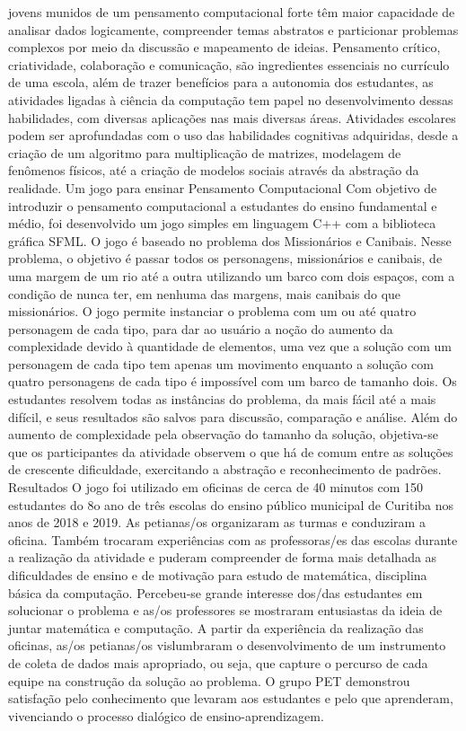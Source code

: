 jovens munidos de um pensamento computacional forte têm maior capacidade de analisar dados
logicamente, compreender temas abstratos e particionar problemas complexos por meio da
discussão e mapeamento de ideias.
Pensamento crítico, criatividade, colaboração e comunicação, são ingredientes essenciais
no currículo de uma escola, além de trazer benefícios para a autonomia dos estudantes, as
atividades ligadas à ciência da computação tem papel no desenvolvimento dessas habilidades,
com diversas aplicações nas mais diversas áreas. Atividades escolares podem ser aprofundadas
com o uso das habilidades cognitivas adquiridas, desde a criação de um algoritmo para
multiplicação de matrizes, modelagem de fenômenos físicos, até a criação de modelos sociais
através da abstração da realidade.
Um jogo para ensinar Pensamento Computacional
Com objetivo de introduzir o pensamento computacional a estudantes do ensino
fundamental e médio, foi desenvolvido um jogo simples em linguagem C++ com a biblioteca
gráfica SFML. O jogo é baseado no problema dos Missionários e Canibais. Nesse problema, o
objetivo é passar todos os personagens, missionários e canibais, de uma margem de um rio até a
outra utilizando um barco com dois espaços, com a condição de nunca ter, em nenhuma das
margens, mais canibais do que missionários. O jogo permite instanciar o problema com um ou
até quatro personagem de cada tipo, para dar ao usuário a noção do aumento da complexidade
devido à quantidade de elementos, uma vez que a solução com um personagem de cada tipo tem
apenas um movimento enquanto a solução com quatro personagens de cada tipo é impossível
com um barco de tamanho dois. Os estudantes resolvem todas as instâncias do problema, da mais
fácil até a mais difícil, e seus resultados são salvos para discussão, comparação e análise. Além
do aumento de complexidade pela observação do tamanho da solução, objetiva-se que os
participantes da atividade observem o que há de comum entre as soluções de crescente
dificuldade, exercitando a abstração e reconhecimento de padrões.
Resultados
O jogo foi utilizado em oficinas de cerca de 40 minutos com 150 estudantes do 8o ano de
três escolas do ensino público municipal de Curitiba nos anos de 2018 e 2019. As petianas/os
organizaram as turmas e conduziram a oficina. Também trocaram experiências com as
professoras/es das escolas durante a realização da atividade e puderam compreender de forma
mais detalhada as dificuldades de ensino e de motivação para estudo de matemática, disciplina
básica da computação. Percebeu-se grande interesse dos/das estudantes em solucionar o
problema e as/os professores se mostraram entusiastas da ideia de juntar matemática e
computação. A partir da experiência da realização das oficinas, as/os petianas/os vislumbraram o
desenvolvimento de um instrumento de coleta de dados mais apropriado, ou seja, que capture o
percurso de cada equipe na construção da solução ao problema. O grupo PET demonstrou
satisfação pelo conhecimento que levaram aos estudantes e pelo que aprenderam, vivenciando o
processo dialógico de ensino-aprendizagem.



